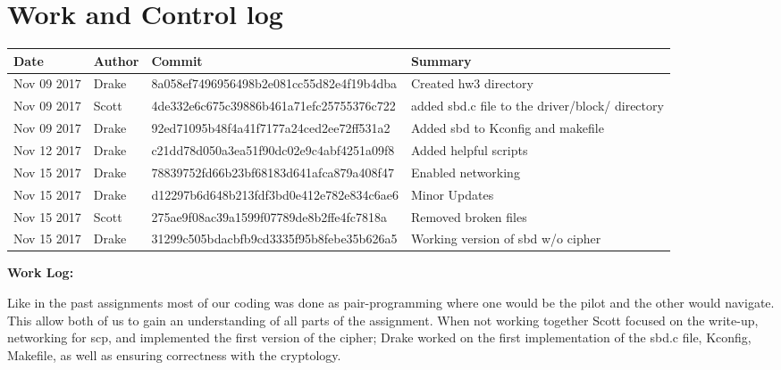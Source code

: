 \documentclass[onecolumn, draftclsnofoot,10pt, compsoc]{IEEEtran}
\begin{document}
\section{Work and Control log}
\begin{center}
    \begin{tabular}{| p{2.5cm} | l | l | p{3cm} |}    
    	\hline
        Date & Author & Commit & Summary \\ \hline
        Nov 09 2017 & Drake & 8a058ef7496956498b2e081cc55d82e4f19b4dba & Created hw3 directory \\ \hline
        Nov 09 2017 & Scott & 4de332e6c675c39886b461a71efc25755376c722 & added sbd.c file to the driver/block/ directory \\ \hline
        Nov 09 2017 & Drake & 92ed71095b48f4a41f7177a24ced2ee72ff531a2 & Added sbd to Kconfig and makefile \\ \hline
        Nov 12 2017 & Drake & c21dd78d050a3ea51f90dc02e9c4abf4251a09f8 & Added helpful scripts \\ \hline
        Nov 15 2017 & Drake & 78839752fd66b23bf68183d641afca879a408f47 & Enabled networking \\ \hline
        Nov 15 2017 & Drake & d12297b6d648b213fdf3bd0e412e782e834c6ae6 & Minor Updates \\ \hline
        Nov 15 2017 & Scott & 275ae9f08ac39a1599f07789de8b2ffe4fc7818a & Removed broken files \\ \hline
        Nov 15 2017&Drake&31299c505bdacbfb9cd3335f95b8febe35b626a5 & Working version of sbd w/o cipher  \\ \hline     	
	\end{tabular}
\linebreak

\textbf{Work Log:}  
\end{center}
Like in the past assignments most of our coding was done as pair-programming where one would be the pilot and the other would navigate. This allow both of us to gain an understanding of all parts of the assignment. When not working together Scott focused on the write-up, networking for scp, and implemented the first version of the cipher; Drake worked on the first implementation of the sbd.c file, Kconfig, Makefile, as well as ensuring correctness with the cryptology.  
\end{document}
